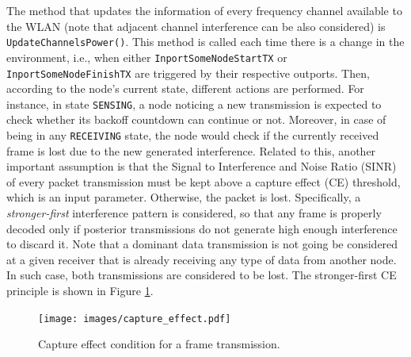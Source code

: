 \documentclass[a4paper]{article}
\begin{document}
	The method that updates the information of every frequency channel available to the WLAN (note that adjacent channel interference can be also considered) is \texttt{UpdateChannelsPower()}. This method is called each time there is a change in the environment, i.e., when either \texttt{InportSomeNodeStartTX} or \texttt{InportSomeNodeFinishTX} are triggered by their respective outports. Then, according to the node's current state, different actions are performed. For instance, in state \texttt{SENSING}, a node noticing a new transmission is expected to check whether its backoff countdown can continue or not. Moreover, in case of being in any \texttt{RECEIVING} state, the node would check if the currently received frame is lost due to the new generated interference. Related to this, another important assumption is that the Signal to Interference and Noise Ratio (SINR) of every packet transmission must be kept above a capture effect (CE) threshold, which is an input parameter. Otherwise, the packet is lost. Specifically, a \emph{stronger-first} interference pattern is considered, so that any frame is properly decoded only if posterior transmissions do not generate high enough interference to discard it. Note that a dominant data transmission is not going be considered at a given receiver that is already receiving any type of data from another node. In such case, both transmissions are considered to be lost. The stronger-first CE principle is shown in Figure \ref{fig:capture_effect}. 
	\begin{figure}[h]
		\centering
		\texttt{[image: images/capture\_effect.pdf]}
		\caption{Capture effect condition for a frame transmission.}    
		\label{fig:capture_effect}
	\end{figure}
	
\end{document}
